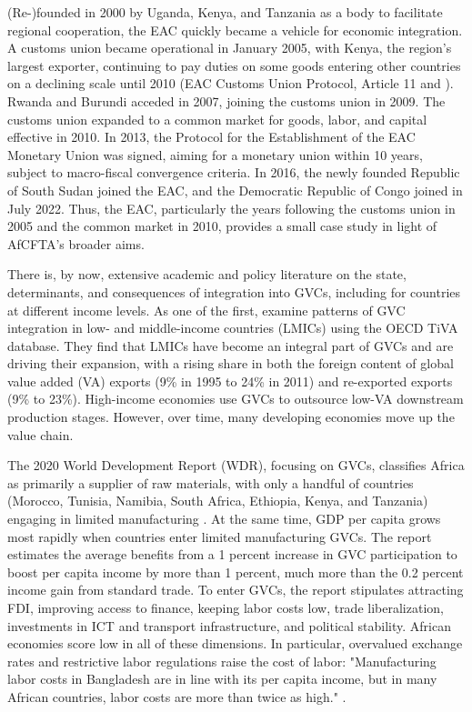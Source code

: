 \documentclass[a4paper]{article}
\begin{document}
(Re-)founded in 2000 by Uganda, Kenya, and Tanzania as a body to facilitate regional cooperation, the EAC quickly became a vehicle for economic integration. A customs union became operational in January 2005, with Kenya, the region's largest exporter, continuing to pay duties on some goods entering other countries on a declining scale until 2010 (EAC Customs Union Protocol, Article 11 and \citet{aloo2017free}). Rwanda and Burundi acceded in 2007, joining the customs union in 2009. The customs union expanded to a common market for goods, labor, and capital effective in 2010. In 2013, the Protocol for the Establishment of the EAC Monetary Union was signed, aiming for a monetary union within 10 years, subject to macro-fiscal convergence criteria. In 2016, the newly founded Republic of South Sudan joined the EAC, and the Democratic Republic of Congo joined in July 2022. Thus, the EAC, particularly the years following the customs union in 2005 and the common market in 2010, provides a small case study in light of AfCFTA's broader aims. \newline 

There is, by now, extensive academic and policy literature on the state, determinants, and consequences of integration into GVCs, including for countries at different income levels. As one of the first, \citet{Kummritz20162} examine patterns of GVC integration in low- and middle-income countries (LMICs) using the OECD TiVA database. They find that LMICs have become an integral part of GVCs and are driving their expansion, with a rising share in both the foreign content of global value added (VA) exports (9\% in 1995 to 24\% in 2011) and re-exported exports (9\% to 23\%). High-income economies use GVCs to outsource low-VA downstream production stages. However, over time, many developing economies move up the value chain. \newline 

The 2020 World Development Report (WDR), focusing on GVCs, classifies Africa as primarily a supplier of raw materials, with only a handful of countries (Morocco, Tunisia, Namibia, South Africa, Ethiopia, Kenya, and Tanzania) engaging in limited manufacturing \citep{world2020trading}. At the same time, GDP per capita grows most rapidly when countries enter limited manufacturing GVCs. The report estimates the average benefits from a 1 percent increase in GVC participation to boost per capita income by more than 1 percent, much more than the 0.2 percent income gain from standard trade. To enter GVCs, the report stipulates attracting FDI, improving access to finance, keeping labor costs low, trade liberalization, investments in ICT and transport infrastructure, and political stability. African economies score low in all of these dimensions. In particular, overvalued exchange rates and restrictive labor regulations raise the cost of labor: "Manufacturing labor costs in Bangladesh are in line with its per capita income, but in many African countries, labor costs are more than twice as high." \citep{world2020trading}. \newline
\end{document}
